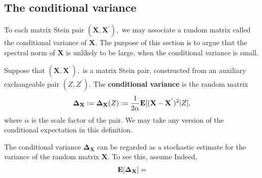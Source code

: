 \subsection{The conditional variance}
To each matrix Stein pair 
  $
  (
    \mathbf{X}
    ,
    \mathbf{X}^{'}
  ),
  $
  we may associate a random matrix called the conditional variance of $\mathbf{X}.$
  The purpose of this section is to argue that the spectral norm of $\mathbf{X}$
  is unlikely to be large, when the conditional variance is small.
\begin{definition}
  Suppose that
  $
  (
    \mathbf{X}
    ,
    \mathbf{X}^{'}
  ),
  $
  is a matrix Stein pair, constructed from an auxiliary exchangeable pair
  $
  (
  Z
    ,
  Z^{'}
  ).
  $
  The \textbf{conditional variance}
  is the random matrix
  \begin{gather}
    \mathbf{\Delta_X}
    :=
    \mathbf{\Delta_X}
    (Z)
    :=
    \frac{1}{2\alpha}
    \mathbf{E}
    [
    (
    \mathbf{X}
    -
    \mathbf{X}^{'}
    )^2
    \vert
    Z
    ]
    ,
  \end{gather}
  where $\alpha$ is the scale factor of the pair. We may take any version of the conditional expectation in this definition.
\end{definition}

The conditional variance
$
    \mathbf{\Delta_X}
$
can be regarded as a stochastic estimate for the variance 
of the random matrix $\mathbf{X}.$
To see this, assume
Indeed, 
\begin{gather}
  \mathbf{E}
  [
    \mathbf{\Delta_X}
  ]
  =
\end{gather}
